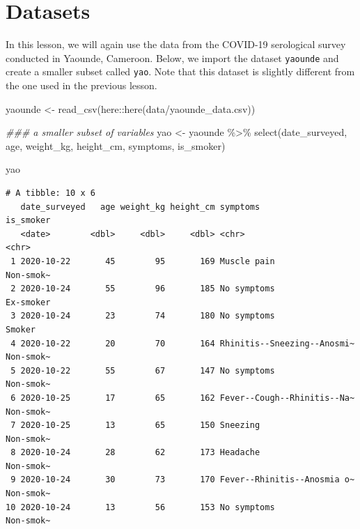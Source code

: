\documentclass[
  letterpaper,
  DIV=11,
  numbers=noendperiod]{scrreprt}
\newenvironment{Shaded}{\begin{snugshade}}{\end{snugshade}}
\newcommand{\DocumentationTok}[1]{\textcolor[rgb]{0.37,0.37,0.37}{\textit{#1}}}
\newcommand{\FunctionTok}[1]{\textcolor[rgb]{0.28,0.35,0.67}{#1}}
\newcommand{\NormalTok}[1]{\textcolor[rgb]{0.00,0.23,0.31}{#1}}
\newcommand{\OtherTok}[1]{\textcolor[rgb]{0.00,0.23,0.31}{#1}}
\newcommand{\SpecialCharTok}[1]{\textcolor[rgb]{0.37,0.37,0.37}{#1}}
\newcommand{\StringTok}[1]{\textcolor[rgb]{0.13,0.47,0.30}{#1}}
\begin{document}
\hypertarget{datasets}{%
\section{Datasets}\label{datasets}}

In this lesson, we will again use the data from the COVID-19 serological
survey conducted in Yaounde, Cameroon. Below, we import the dataset
\texttt{yaounde} and create a smaller subset called \texttt{yao}. Note
that this dataset is slightly different from the one used in the
previous lesson.

\begin{Shaded}
\begin{Highlighting}[]
\NormalTok{yaounde }\OtherTok{\textless{}{-}} \FunctionTok{read\_csv}\NormalTok{(here}\SpecialCharTok{::}\FunctionTok{here}\NormalTok{(}\StringTok{\textquotesingle{}data/yaounde\_data.csv\textquotesingle{}}\NormalTok{))}

\DocumentationTok{\#\#\# a smaller subset of variables}
\NormalTok{yao }\OtherTok{\textless{}{-}}\NormalTok{ yaounde }\SpecialCharTok{\%\textgreater{}\%} \FunctionTok{select}\NormalTok{(date\_surveyed, }
\NormalTok{                          age, }
\NormalTok{                          weight\_kg, height\_cm, }
\NormalTok{                          symptoms, is\_smoker)}

\NormalTok{yao}
\end{Highlighting}
\end{Shaded}

\begin{verbatim}
# A tibble: 10 x 6
   date_surveyed   age weight_kg height_cm symptoms                    is_smoker
   <date>        <dbl>     <dbl>     <dbl> <chr>                       <chr>    
 1 2020-10-22       45        95       169 Muscle pain                 Non-smok~
 2 2020-10-24       55        96       185 No symptoms                 Ex-smoker
 3 2020-10-24       23        74       180 No symptoms                 Smoker   
 4 2020-10-22       20        70       164 Rhinitis--Sneezing--Anosmi~ Non-smok~
 5 2020-10-22       55        67       147 No symptoms                 Non-smok~
 6 2020-10-25       17        65       162 Fever--Cough--Rhinitis--Na~ Non-smok~
 7 2020-10-25       13        65       150 Sneezing                    Non-smok~
 8 2020-10-24       28        62       173 Headache                    Non-smok~
 9 2020-10-24       30        73       170 Fever--Rhinitis--Anosmia o~ Non-smok~
10 2020-10-24       13        56       153 No symptoms                 Non-smok~
\end{verbatim}
\end{document}
